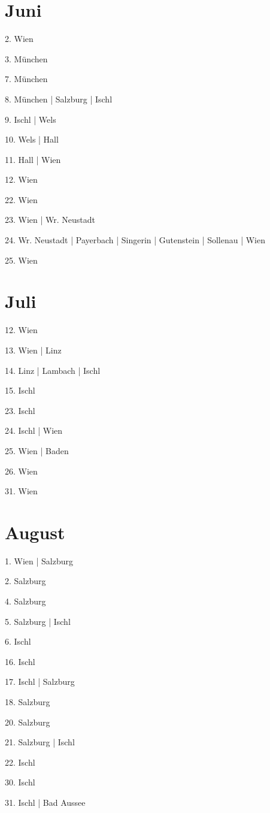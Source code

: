 \documentclass[twoside=false,titlepage=false,open=any, parskip=never, fontsize=10pt, headings=small, chapterprefix=false, appendixprefix=false, DIV=15]{scrbook}
\begin{document}
\begin{multicols}{3}
            \section*{Juni}
            2. Wien\par
            3. München\par
            7. München\par
            8. München | Salzburg | Ischl\par
            9. Ischl | Wels\par
            10. Wels | Hall\par
            11. Hall | Wien\par
            12. Wien\par
            22. Wien\par
            23. Wien | Wr. Neustadt\par
            24. Wr. Neustadt | Payerbach | Singerin | Gutenstein | Sollenau | Wien\par
            25. Wien\par
            \section*{Juli}
            12. Wien\par
            13. Wien | Linz\par
            14. Linz | Lambach | Ischl\par
            15. Ischl\par
            23. Ischl\par
            24. Ischl | Wien\par
            25. Wien | Baden\par
            26. Wien\par
            31. Wien\par
            \section*{August}
            1. Wien | Salzburg\par
            2. Salzburg\par
            4. Salzburg\par
            5. Salzburg | Ischl\par
            6. Ischl\par
            16. Ischl\par
            17. Ischl | Salzburg\par
            18. Salzburg\par
            20. Salzburg\par
            21. Salzburg | Ischl\par
            22. Ischl\par
            30. Ischl\par
            31. Ischl | Bad Aussee\par

\end{multicols}
\end{document}

